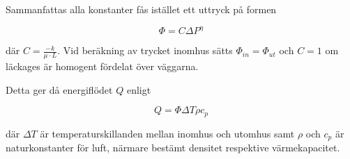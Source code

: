 Sammanfattas alla konstanter fås istället ett uttryck på formen

\begin{equation}
\Phi = C\Delta P^\eta
\end{equation}

där $C=\frac{-k}{\mu \cdot L}$. Vid beräkning av trycket inomhus sätts $\Phi_{in} = \Phi_{ut}$ och $C=1$ om läckages är homogent fördelat över väggarna.

Detta ger då energiflödet $Q$ enligt

\begin{equation}
Q = \Phi \Delta T \rho c_p
\end{equation}

där $\Delta T$ är temperaturskillanden mellan inomhus och utomhus samt $\rho$ och $c_p$ är naturkonstanter för luft, närmare bestämt densitet respektive värmekapacitet.


